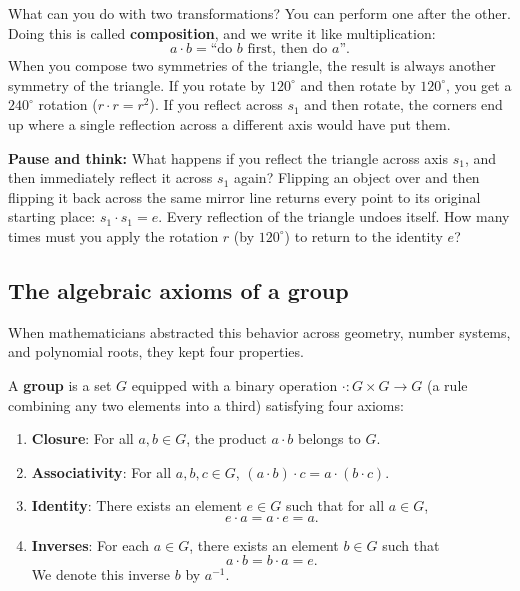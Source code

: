 What can you do with two transformations? You can perform one after the other. Doing this is called \textbf{composition}, and we write it like multiplication:
\[
a \cdot b = \text{``do } b \text{ first, then do } a\text{''}.
\]
When you compose two symmetries of the triangle, the result is always another symmetry of the triangle. If you rotate by $120^\circ$ and then rotate by $120^\circ$, you get a $240^\circ$ rotation ($r \cdot r = r^2$). If you reflect across $s_1$ and then rotate, the corners end up where a single reflection across a different axis would have put them.

\begin{recoverybox}
\textbf{Pause and think:} What happens if you reflect the triangle across axis $s_1$, and then immediately reflect it across $s_1$ again?
Flipping an object over and then flipping it back across the same mirror line returns every point to its original starting place: $s_1 \cdot s_1 = e$. Every reflection of the triangle undoes itself. How many times must you apply the rotation $r$ (by $120^\circ$) to return to the identity $e$?
\end{recoverybox}

\subsection{The algebraic axioms of a group}

When mathematicians abstracted this behavior across geometry, number systems, and polynomial roots, they kept four properties.

\begin{definition}[Group]\label{21:def-group}
A \textbf{group} is a set $G$ equipped with a binary operation $\cdot : G \times G \to G$ (a rule combining any two elements into a third) satisfying four axioms:
\begin{enumerate}
\item \textbf{Closure}: For all $a, b \in G$, the product $a \cdot b$ belongs to $G$.
\item \textbf{Associativity}: For all $a, b, c \in G$, $(a \cdot b) \cdot c = a \cdot (b \cdot c)$.
\item \textbf{Identity}: There exists an element $e \in G$ such that for all $a \in G$,
\[
e \cdot a = a \cdot e = a.
\]
\item \textbf{Inverses}: For each $a \in G$, there exists an element $b \in G$ such that
\[
a \cdot b = b \cdot a = e.
\]
We denote this inverse $b$ by $a^{-1}$.
\end{enumerate}
\end{definition}

